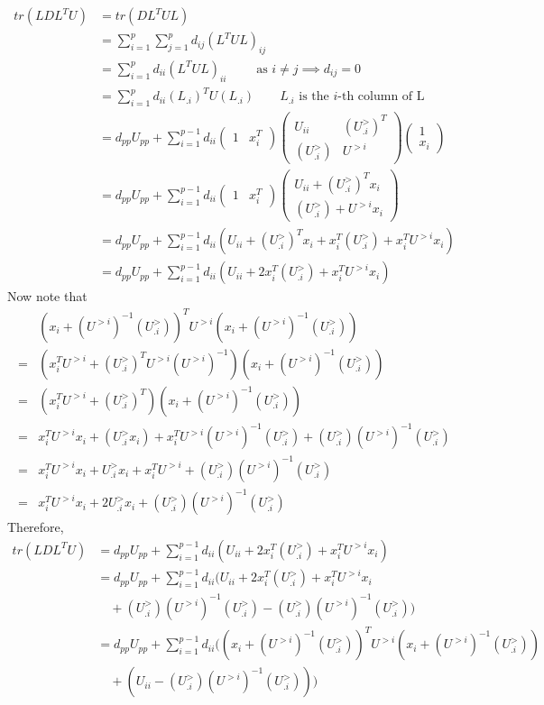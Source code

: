 \documentclass[12pt, leqno]{article}
\begin{document}
\begin{align*}
tr(LDL^T U) &= tr(DL^T UL) \\
&= \sum_{i=1}^p \sum_{j=1}^p d_{ij} (L^T UL)_{ij} \\
&= \sum_{i=1}^p d_{ii} (L^T UL)_{ii} \qquad \text{ as } i\not=j
  \implies d_{ij} = 0 \\
&= \sum_{i=1}^p d_{ii} (L_{.i})^T U(L_{.i}) \qquad L_{.i} \text{ is the
  $i$-th column of L}\\
&= d_{pp} U_{pp} + \sum_{i=1}^{p-1} d_{ii} 
\begin{pmatrix} 
1 & x_i^T
\end{pmatrix}  
\begin{pmatrix} 
U_{ii} & (U_{.i}^>)^T\\
(U_{.i}^>) & U^{>i}
\end{pmatrix} 
\begin{pmatrix} 1 \\ x_i
\end{pmatrix} \\
&= d_{pp} U_{pp} + \sum_{i=1}^{p-1} d_{ii} 
\begin{pmatrix} 
1 & x_i^T
\end{pmatrix}  
\begin{pmatrix} 
U_{ii} + (U_{.i}^>) ^T x_i
\\
(U_{.i}^>) + U^{>i}x_i
\end{pmatrix} \\
&= d_{pp} U_{pp} + \sum_{i=1}^{p-1} d_{ii} 
(U_{ii} + (U_{.i}^>)^T x_i + 
x_i^T (U_{.i}^>) + x_i^T U^{>i}x_i)\\
&= d_{pp} U_{pp} + \sum_{i=1}^{p-1} d_{ii} 
(U_{ii}  + 
2x_i^T (U_{.i}^>) + x_i^T U^{>i}x_i)
\end{align*}
Now note that 
\begin{align*}
&(x_i+(U^{>i})^{-1}(U_{.i}^>)
  )^TU^{>i}(x_i+(U^{>i})^{-1}(U_{.i}^>) )\\
=&(x_i^TU^{>i}+(U_{.i}^>)
  ^T U^{>i} (U^{>i})^{-1})(x_i+(U^{>i})^{-1}(U_{.i}^>) ) \\
=&(x_i^TU^{>i}+(U_{.i}^>)
  ^T)(x_i+(U^{>i})^{-1}(U_{.i}^>) ) \\
=&x_i^TU^{>i}x_i+(U_{.i}^>x_i) + x_i^TU^{>i}(U^{>i})^{-1}(U_{.i}^>)
   +(U_{.i}^>) (U^{>i})^{-1}(U_{.i}^>)\\
=&x_i^TU^{>i}x_i+U_{.i}^>x_i + x_i^TU^{>i}+(U_{.i}^>)
   (U^{>i})^{-1}(U_{.i}^>)\\
=&x_i^TU^{>i}x_i+2U_{.i}^>x_i +(U_{.i}^>) (U^{>i})^{-1}(U_{.i}^>) 
\end{align*}
Therefore, 
\begin{align*}
tr(LDL^T U) &= d_{pp} U_{pp} + \sum_{i=1}^{p-1} d_{ii} 
(U_{ii}  + 
2x_i^T (U_{.i}^>) + x_i^T U^{>i}x_i) \\
&= d_{pp} U_{pp} + \sum_{i=1}^{p-1} d_{ii} 
(U_{ii}  + 
2x_i^T (U_{.i}^>) + x_i^T U^{>i}x_i \\
&\quad +(U_{.i}^>) (U^{>i})^{-1}(U_{.i}^>) -(U_{.i}^>)
  (U^{>i})^{-1}(U_{.i}^>) )\\
&= d_{pp} U_{pp} + \sum_{i=1}^{p-1} d_{ii} 
((x_i+(U^{>i})^{-1}(U_{.i}^>)
  )^TU^{>i}(x_i+(U^{>i})^{-1}(U_{.i}^>)) \\
&\quad +(U_{ii} - (U_{.i}^>) (U^{>i})^{-1}(U_{.i}^>)))
\end{align*}
\end{document}
